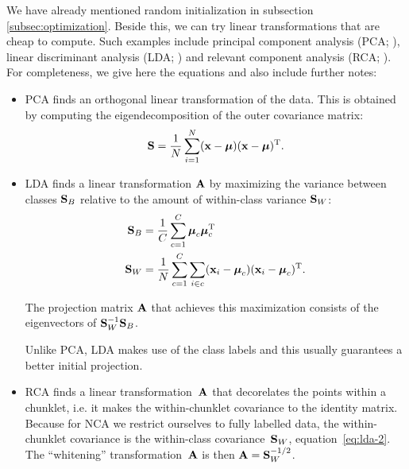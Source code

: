     We have already mentioned random initialization in subsection \ref{subsec:optimization}. Beside this, we can try linear transformations that are cheap to compute. Such examples include  principal component analysis (PCA; \citealp{pearson1901}), linear discriminant analysis (LDA; \citealp{fisher1936}) and relevant component analysis (RCA; \citealp{bar2003}). For completeness, we give here the equations and also include further notes:
        \begin{itemize}
            \item  PCA finds an orthogonal linear
                transformation of the data. This is
                obtained by computing the
                eigendecomposition of the outer covariance
                matrix:
                \begin{align}
                    \mathbf{S} = \frac{1}{N}\sum_{i=1}^N (\mathbf{x}-\mbox{\boldmath $\mu$})(\mathbf{x}-\mbox{\boldmath $\mu$})^\textrm{T}.
                    \label{eq:pca-1}
                \end{align}

            \item LDA finds a linear transformation $\mathbf{A}$ by maximizing the
variance between classes $\mathbf{S}_B$ relative to the amount of within-class variance
$\mathbf{S}_W$:
            \begin{align}
             \mathbf{S}_B &=
\frac{1}{C}\sum_{c=1}^{C}\boldsymbol\mu_c\boldsymbol\mu_c^\textrm{T}\label{eq:lda-1}\\
             \mathbf{S}_W &= \frac{1}{N}\sum_{c=1}^{C}\sum_{i \in
c}(\mathbf{x}_i-\boldsymbol{\mbox{\boldmath $\mu$}}_c)(\mathbf{x}_i-\boldsymbol{\mu}_c)^\textrm{T}.\label{eq:lda-2}
            \end{align}

            The projection matrix $\mathbf{A}$ that achieves this maximization consists
of the eigenvectors of $\mathbf{S}_W^{-1}\mathbf{S}_B$.

            Unlike PCA, LDA makes use of the class labels and this
usually guarantees a better initial projection.

            \item RCA finds a linear transformation~$\mathbf{A}$
                that decorelates the points within a chunklet, i.e. it makes the within-chunklet covariance to the identity matrix.
                Because for NCA we restrict ourselves to
                fully labelled data, the within-chunklet
                covariance is the within-class covariance~$\mathbf{S}_W$, equation~\eqref{eq:lda-2}. The
                ``whitening'' transformation~$\mathbf{A}$ is then
                $\mathbf{A}=\mathbf{S}_W^{-1/2}$.
        \end{itemize}

